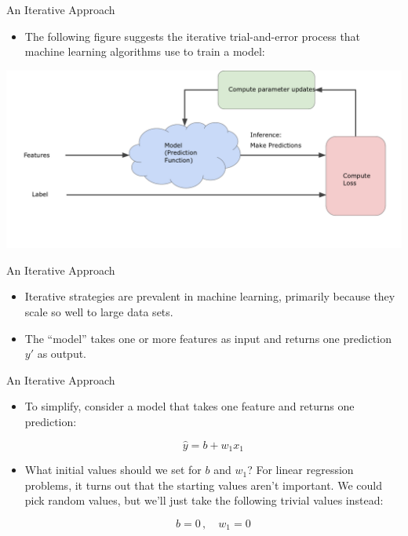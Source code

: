 \documentclass{beamer}
\begin{document}
\begin{frame}{An Iterative Approach}
\begin{itemize}
    \item The following figure suggests the iterative trial-and-error process that machine learning algorithms use to train a model:
\end{itemize}
\includegraphics[width=\textwidth]{images/GradientDescentDiagram.png}
\end{frame}

\begin{frame}{An Iterative Approach}
\begin{itemize}
    
    \item Iterative strategies are prevalent in machine learning, primarily because they scale so well to large data sets.

    \item The ``model'' takes one or more features as input and returns one prediction $y'$ as output. 
    
\end{itemize}
\end{frame}

\begin{frame}{An Iterative Approach}
\begin{itemize}
    \item To simplify, consider a model that takes one feature and returns one prediction:

    $$ \hat{y} = b + w_1 x_1 $$
    
    \item What initial values should we set for $b$ and $w_1$? For linear regression problems, it turns out that the starting values aren't important. We could pick random values, but we'll just take the following trivial values instead:
    
    $$ b = 0\,, \quad w_1 = 0 $$

\end{itemize}
\end{frame}
\end{document}
